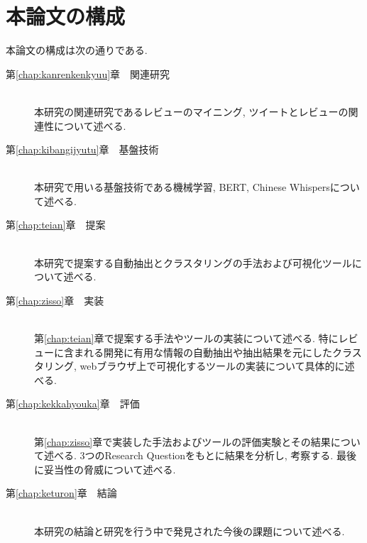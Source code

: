\section{本論文の構成}
本論文の構成は次の通りである. 
\begin{description}

\item[第\ref{chap:kanrenkenkyuu}章　関連研究]\mbox{}\\
本研究の関連研究であるレビューのマイニング, ツイートとレビューの関連性について述べる. \\

\item[第\ref{chap:kibangijyutu}章　基盤技術]\mbox{}\\
本研究で用いる基盤技術である機械学習, BERT, Chinese Whispersについて述べる. \\

\item[第\ref{chap:teian}章　提案]\mbox{}\\
本研究で提案する自動抽出とクラスタリングの手法および可視化ツールについて述べる. \\

\item[第\ref{chap:zisso}章　実装]\mbox{}\\
第\ref{chap:teian}章で提案する手法やツールの実装について述べる. 特にレビューに含まれる開発に有用な情報の自動抽出や抽出結果を元にしたクラスタリング, webブラウザ上で可視化するツールの実装について具体的に述べる. \\

\item[第\ref{chap:kekkahyouka}章　評価]\mbox{}\\
第\ref{chap:zisso}章で実装した手法およびツールの評価実験とその結果について述べる. 3つのResearch Questionをもとに結果を分析し, 考察する. 最後に妥当性の脅威について述べる. \\

\item[第\ref{chap:keturon}章　結論]\mbox{}\\
本研究の結論と研究を行う中で発見された今後の課題について述べる. \\

\end{description}